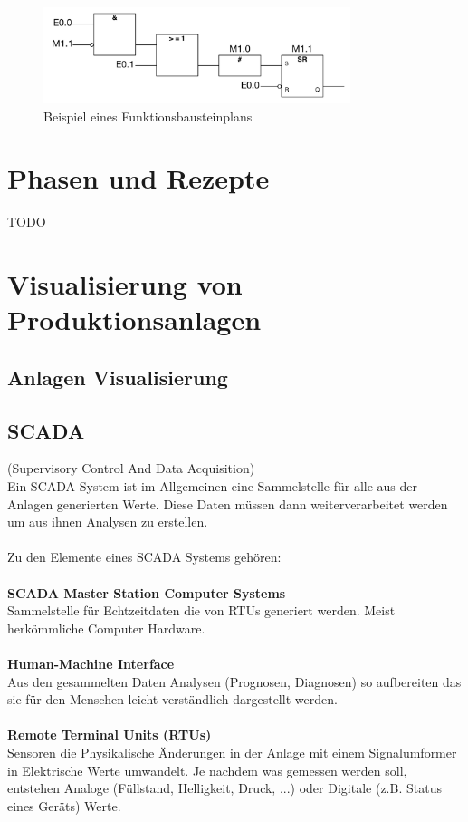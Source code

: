 	\begin{figure}[h!]
  		\centering
    	\includegraphics[width=0.8\textwidth]{graphics/stateoftheart/funktionsbausteinplan_Selfmade.png}
  		\caption{Beispiel eines Funktionsbausteinplans \cite{funktionsbausteinplan}}
	\end{figure}

\section{Phasen und Rezepte}

TODO

\section{Visualisierung von Produktionsanlagen}
\subsection{Anlagen Visualisierung}
\subsection{SCADA}
(Supervisory Control And Data Acquisition)\\
Ein SCADA System ist im Allgemeinen eine Sammelstelle für alle aus der Anlagen generierten Werte. Diese Daten müssen dann weiterverarbeitet werden um aus ihnen Analysen zu erstellen.\\
\\
Zu den Elemente eines SCADA Systems gehören:\\
\\
\textbf{SCADA Master Station Computer Systems}\\
Sammelstelle für Echtzeitdaten die von RTUs generiert werden. Meist herkömmliche Computer Hardware.\\
\\
\textbf{Human-Machine Interface}\\
Aus den gesammelten Daten Analysen (Prognosen, Diagnosen) so aufbereiten das sie für den Menschen leicht verständlich dargestellt werden.\\
\\
\textbf{Remote Terminal Units (RTUs)}\\
Sensoren die Physikalische Änderungen in der Anlage mit einem Signalumformer in Elektrische Werte umwandelt. Je nachdem was gemessen werden soll, entstehen Analoge (Füllstand, Helligkeit, Druck, ...) oder Digitale (z.B. Status eines Geräts) Werte.\\

